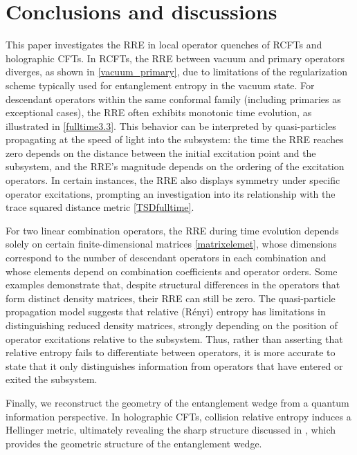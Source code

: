 \documentclass[12pt]{article}
\begin{document}
\section{Conclusions and discussions}\label{section6}
This paper investigates the RRE in local operator quenches of RCFTs and holographic CFTs. In RCFTs, the RRE between vacuum and primary operators diverges, as shown in \eqref{vacuum_primary}, due to limitations of the regularization scheme typically used for entanglement entropy in the vacuum state. For descendant operators within the same conformal family (including primaries as exceptional cases), the RRE often exhibits monotonic time evolution, as illustrated in \eqref{fulltime3.3}. This behavior can be interpreted by quasi-particles propagating at the speed of light into the subsystem: the time the RRE reaches zero depends on the distance between the initial excitation point and the subsystem, and the RRE’s magnitude depends on the ordering of the excitation operators. In certain instances, the RRE also displays symmetry under specific operator excitations, prompting an investigation into its relationship with the trace squared distance metric \eqref{TSDfulltime}.

For two linear combination operators, the RRE during time evolution depends solely on certain finite-dimensional matrices \eqref{matrixelemet}, whose dimensions correspond to the number of descendant operators in each combination and whose elements depend on combination coefficients and operator orders. Some examples demonstrate that, despite structural differences in the operators that form distinct density matrices, their RRE can still be zero. The quasi-particle propagation model suggests that relative (R\'enyi) entropy has limitations in distinguishing reduced density matrices, strongly depending on the position of operator excitations relative to the subsystem. Thus, rather than asserting that relative entropy fails to differentiate between operators, it is more accurate to state that it only distinguishes information from operators that have entered or exited the subsystem.

Finally, we reconstruct the geometry of the entanglement wedge from a quantum information perspective. In holographic CFTs, collision relative entropy induces a Hellinger metric, ultimately revealing the sharp structure discussed in \cite{Suzuki:2019xdq}, which provides the geometric structure of the entanglement wedge.
\end{document}
